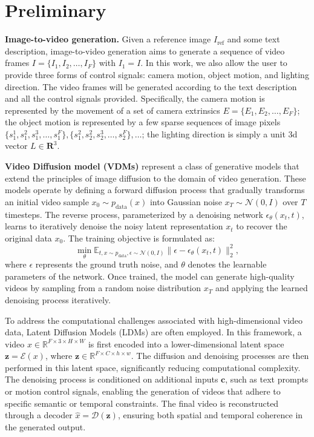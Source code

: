 \maketitlesupplementary
\appendix


\section{Preliminary}
\noindent \textbf{Image-to-video generation.} 
Given a reference image $I_{\text{ref}}$ and some text description, image-to-video generation aims to generate a sequence of video frames $I = \{I_1, I_2, \ldots, I_F\}$ with $I_1 = I$. In this work, we also allow the user to provide three forms of control signals: camera motion, object motion, and lighting direction. The video frames will be generated according to the text description and all the control signals provided. 
Specifically, the camera motion is represented by the movement of a set of camera extrinsics $E = \{E_1, E_2, \ldots, E_F\}$; the object motion is represented by a few sparse sequences of image pixels $\{s_1^1, s_1^2, s_1^3, \ldots, s_1^{F}\}, \{s_1^2, s_2^2, s_2^3, \ldots, s_2^{F}\}, \ldots$; the lighting direction is simply a unit 3d vector $L \in \boldsymbol{R}^3$.

\noindent \textbf{Video Diffusion model (VDMs)} represent a class of generative models that extend the principles of image diffusion to the domain of video generation. These models operate by defining a forward diffusion process that gradually transforms an initial video sample \(x_0 \sim p_{\text{data}}(x)\) into Gaussian noise \(x_T \sim \mathcal{N}(0, I)\) over \(T\) timesteps. The reverse process, parameterized by a denoising network \(\epsilon_\theta(x_t, t)\), learns to iteratively denoise the noisy latent representation \(x_t\) to recover the original data \(x_0\). The training objective is formulated as:
\[
\min_{\theta} \mathbb{E}_{t, x \sim p_{\text{data}}, \epsilon \sim \mathcal{N}(0, I)} \|\epsilon - \epsilon_\theta(x_t, t)\|^2_2,
\]
where \(\epsilon\) represents the ground truth noise, and \(\theta\) denotes the learnable parameters of the network. Once trained, the model can generate high-quality videos by sampling from a random noise distribution \(x_T\) and applying the learned denoising process iteratively.

To address the computational challenges associated with high-dimensional video data, Latent Diffusion Models (LDMs) are often employed. In this framework, a video \(x \in \mathbb{R}^{F \times 3 \times H \times W}\) is first encoded into a lower-dimensional latent space \(\mathbf{z} = \mathcal{E}(x)\), where \(\mathbf{z} \in \mathbb{R}^{F \times C \times h \times w}\). The diffusion and denoising processes are then performed in this latent space, significantly reducing computational complexity. The denoising process is conditioned on additional inputs \(\mathbf{c}\), such as text prompts or motion control signals, enabling the generation of videos that adhere to specific semantic or temporal constraints. The final video is reconstructed through a decoder \(\hat{x} = \mathcal{D}(\mathbf{z})\), ensuring both spatial and temporal coherence in the generated output.


